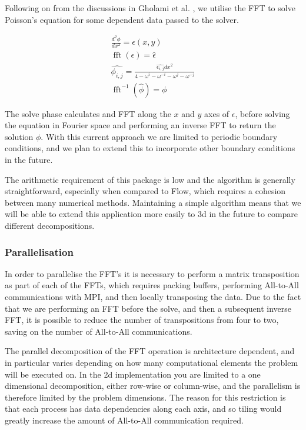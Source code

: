 \documentclass[runningheads,a4paper]{llncs}
\DeclareMathOperator{\fft}{fft}
\begin{document}
Following on from the discussions in Gholami et al. \cite{Gholami2014}, we utilise the FFT to solve Poisson's equation for some dependent data passed to the solver. 

\begin{align}
  \frac{d^2\phi}{dx^2} = \epsilon(x, y) \\
  \fft(\epsilon) = \hat{\epsilon} \\
  \hat{\phi_{i,j}} = \frac{\hat{\epsilon_{i,j}} dx^2 }{4 - \omega^i - \omega^{-i} - \omega^{j} - \omega^{-j}} \\
  \fft^{-1}(\hat{\phi}) = \phi
\end{align}

The solve phase calculates and FFT along the $x$ and $y$ axes of $\epsilon$, before solving the equation in Fourier space and performing an inverse FFT to return the solution $\phi$. With this current approach we are limited to periodic boundary conditions, and we plan to extend this to incorporate other boundary conditions in the future. 

The arithmetic requirement of this package is low and the algorithm is generally straightforward, especially when compared to Flow, which requires a cohesion between many numerical methods. Maintaining a simple algorithm means that we will be able to extend this application more easily to 3d in the future to compare different decompositions.

\subsubsection{Parallelisation}

In order to parallelise the FFT's it is necessary to perform a matrix transposition as part of each of the FFTs, which requires packing buffers, performing All-to-All communications with MPI, and then locally transposing the data. Due to the fact that we are performing an FFT before the solve, and then a subsequent inverse FFT, it is possible to reduce the number of transpositions from four to two, saving on the number of All-to-All communications.

The parallel decomposition of the FFT operation is architecture dependent, and in particular varies depending on how many computational elements the problem will be executed on. In the 2d implementation you are limited to a one dimensional decomposition, either row-wise or column-wise, and the parallelism is therefore limited by the problem dimensions. The reason for this restriction is that each process has data dependencies along each axis, and so tiling would greatly increase the amount of All-to-All communication required. 
\end{document}
